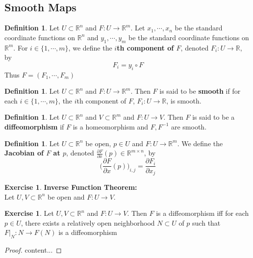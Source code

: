 \documentclass[12pt]{amsart}
\theoremstyle{definition}
\newtheorem{defn}[definition]{Definition}
\theoremstyle{remark}
\theoremstyle{definition}
\newtheorem{ex}[definition]{Exercise}
\newcommand{\R}{\mathbb{R}}
\newcommand{\p}{\partial}
\begin{document}
	
	\subsection{Smooth Maps}
	\begin{defn}
	Let $U \subset \R^n$ and $F: U \rightarrow \R^m$. Let $x_1, \cdots, x_n$ be the standard coordinate functions on $\R^n$ and $y_1, \cdots, y_m$ be the standard coordinate functions on $\R^m$. For $i \in \{1, \cdots, m\}$, we define the \textbf{$i$th component of $F$}, denoted $F_i: U \rightarrow \R$, by $$F_i = y_i \circ F$$ 
	Thus $F = (F_1, \cdots, F_m)$
	\end{defn}
	
	\begin{defn}
	Let $U \subset \R^n$ and $F: U \rightarrow \R^m$. Then $F$ is said to be \textbf{smooth} if for each $i \in \{1, \cdots, m\}$, the $i$th component of $F$, $F_i: U \rightarrow \R$, is smooth.
	\end{defn}

	\begin{defn}
		Let $U \subset \R^n$ and $V \subset \R^m$ and $F: U \rightarrow V$. Then $F$ is said to be a  \textbf{diffeomorphism} if $F$ is a homeomorphism and $F, F^{-1}$ are smooth. 
	\end{defn}
	
	\begin{defn}
	Let $U \subset \R^n$ be open, $p \in U$ and $F: U \rightarrow \R^m$. We define the \textbf{Jacobian of $F$ at $p$}, denoted $\frac{\p F}{\p x}(p) \in \R^{m \times n}$, by $$\bigg (\frac{\p F}{\p x}(p) \bigg )_{i,j} = \frac{\p F_i}{\p x_j}$$
	\end{defn}
	
	\begin{ex}\textbf{Inverse Function Theorem:}\\
	Let $U,V \subset \R^n$ be open and $F: U \rightarrow V$.
	\end{ex}
	
	\begin{ex}
		Let $U,V \subset \R^n$ and $F: U \rightarrow V$. Then $F$ is a diffeomorphism iff for each $p \in U$, there exists a relatively open neighborhood $N \subset U$ of $p$ such that $F|_N:N \rightarrow F(N)$ is a diffeomorphism
	\end{ex}
	
	\begin{proof}
		content...
	\end{proof}

\newpage
\end{document}
